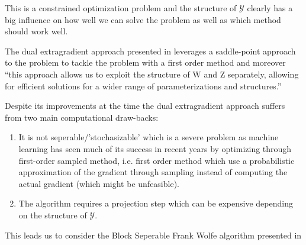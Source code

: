 This is a constrained optimization problem and the structure of $\mathcal Y$
clearly has a big influence on how well we can solve the problem as
well as which method should work well. 

The dual extragradient approach presented in
\citet{taskarStructuredPredictionDual2006} leverages
a saddle-point approach to the problem to tackle the problem
with a first order method and moreover ``this approach
allows us to exploit the structure of W and Z separately, allowing for efficient solutions for a wider
range of parameterizations and structures.''\citep{taskarStructuredPredictionDual2006}

\clearpage
Despite its improvements at the time the dual extragradient approach suffers
from two main computational draw-backs:
\begin{enumerate}
\item It is not seperable/'stochasizable' which is a severe problem as
  machine learning has seen much of its success in recent years by optimizing
  through first-order sampled method, i.e. first order method which
  use a probabilistic approximation of the gradient through sampling instead
  of computing the actual gradient (which might be unfeasible).

\item  The algorithm requires a projection step which can be expensive depending
  on the structure of $\mathcal Y$.
\end{enumerate} 
 
This leads us to consider the Block Seperable Frank Wolfe algorithm
presented in \citet{lacoste-julienBlockCoordinateFrankWolfeOptimization2013}




